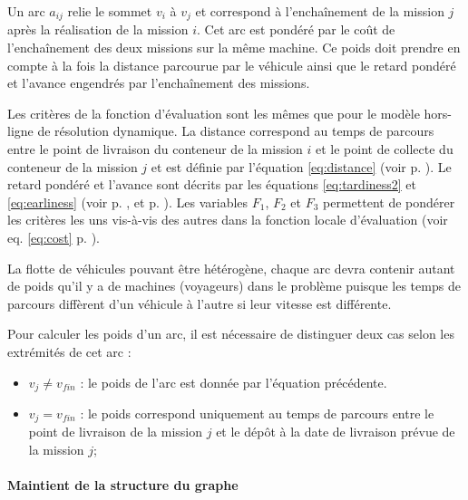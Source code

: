 Un arc $a_{ij}$ relie le sommet $v_i$ à $v_j$ et correspond à l'enchaînement de la mission $j$ après la réalisation de la mission $i$. Cet arc est pondéré par le coût de l'enchaînement des deux missions sur la même machine. Ce poids doit prendre en compte à la fois la distance parcourue par le véhicule ainsi que le retard pondéré et l'avance engendrés par l'enchaînement des missions.

Les critères de la fonction d'évaluation sont les mêmes que pour le modèle hors-ligne de résolution dynamique. La distance correspond au temps de parcours entre le point de livraison du conteneur de la mission $i$ et le point de collecte du conteneur de la mission $j$ et est définie par l'équation \ref{eq:distance} (voir p. \pageref{eq:distance}). Le retard pondéré et l'avance sont décrits par les équations \ref{eq:tardiness2} et \ref{eq:earliness} (voir p. \pageref{eq:tardiness2}, et p. \pageref{eq:earliness}). Les variables $F_1$, $F_2$ et $F_3$ permettent de pondérer les critères les uns vis-à-vis des autres dans la fonction locale d'évaluation (voir eq. \ref{eq:cost} p. \pageref{eq:cost}).

La flotte de véhicules pouvant être hétérogène, chaque arc devra contenir autant de poids qu'il y a de machines (voyageurs) dans le problème puisque les temps de parcours diffèrent d'un véhicule à l'autre si leur vitesse est différente. 

Pour calculer les poids d'un arc, il est nécessaire de distinguer deux cas selon les extrémités de cet arc :
\begin{itemize}
 \item $v_j \neq v_{fin} $ : le poids de l'arc est donnée par l'équation précédente.
 \item $v_j = v_{fin}$ : le poids correspond uniquement au temps de parcours entre le point de livraison de la mission $j$ et le dépôt à la date de livraison prévue de la mission $j$;
\end{itemize}

\paragraph{Maintient de la structure du graphe}

